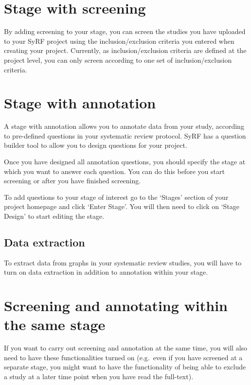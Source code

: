 \documentclass[
]{book}
\begin{document}
\hypertarget{stage-with-screening}{%
\section{Stage with screening}\label{stage-with-screening}}

By adding screening to your stage, you can screen the studies you have uploaded to your SyRF project using the inclusion/exclusion criteria you entered when creating your project. Currently, as inclusion/exclusion criteria are defined at the project level, you can only screen according to one set of inclusion/exclusion criteria.

\hypertarget{stage-with-annotation}{%
\section{Stage with annotation}\label{stage-with-annotation}}

A stage with annotation allows you to annotate data from your study, according to pre-defined questions in your systematic review protocol. SyRF has a question builder tool to allow you to design questions for your project.

Once you have designed all annotation questions, you should specify the stage at which you want to answer each question. You can do this before you start screening or after you have finished screening.

To add questions to your stage of interest go to the `Stages' section of your project homepage and click `Enter Stage'. You will then need to click on `Stage Design' to start editing the stage.

\hypertarget{data-extraction-1}{%
\subsection{Data extraction}\label{data-extraction-1}}

To extract data from graphs in your systematic review studies, you will have to turn on data extraction in addition to annotation within your stage.

\hypertarget{screening-and-annotating-within-the-same-stage}{%
\section{Screening and annotating within the same stage}\label{screening-and-annotating-within-the-same-stage}}

If you want to carry out screening and annotation at the same time, you will also need to have these functionalities turned on (e.g.~even if you have screened at a separate stage, you might want to have the functionality of being able to exclude a study at a later time point when you have read the full-text).
\end{document}
